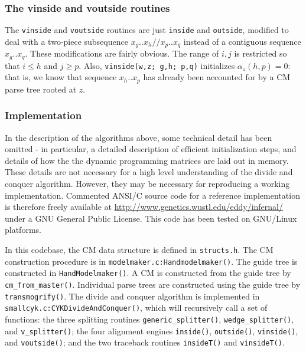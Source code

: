 \documentclass[11pt]{article}
\begin{document}
\subsubsection{The vinside and voutside routines}

The \texttt{vinside} and \texttt{voutside} routines are just
\texttt{inside} and \texttt{outside}, modified to deal with a
two-piece subsequence $x_g..x_h//x_p..x_q$ instead of a contiguous
sequence $x_g..x_q$. These modifications are fairly obvious. The
range of $i,j$ is restricted so that $i \leq h$ and $j \geq p$.  Also,
\texttt{vinside(w,z; g,h; p,q)} initializes $\alpha_z(h,p) = 0$: that
is, we know that sequence $x_h..x_p$ has already been accounted for by
a CM parse tree rooted at $z$.

\subsubsection{Implementation}

In the description of the algorithms above, some technical detail has
been omitted - in particular, a detailed description of efficient
initialization steps, and details of how the the dynamic programming
matrices are laid out in memory. These details are not necessary for a
high level understanding of the divide and conquer algorithm. However,
they may be necessary for reproducing a working
implementation. Commented ANSI/C source code for a reference
implementation is therefore freely available at
\url{http://www.genetics.wustl.edu/eddy/infernal/} under a GNU General
Public License. This code has been tested on GNU/Linux platforms.

In this codebase, the CM data structure is defined in
\texttt{structs.h}. The CM construction procedure is in
\texttt{modelmaker.c:Handmodelmaker()}. The guide tree is constructed
in \texttt{HandModelmaker()}. A CM is constructed from the guide tree
by \texttt{cm\_from\_master()}. Individual parse trees are constructed
using the guide tree by \texttt{transmogrify()}.  The divide and
conquer algorithm is implemented in
\texttt{smallcyk.c:CYKDivideAndConquer()}, which will recursively call
a set of functions: the three splitting routines
\texttt{generic\_splitter()}, \texttt{wedge\_splitter()}, and
\texttt{v\_splitter()}; the four alignment engines \texttt{inside()},
\texttt{outside()}, \texttt{vinside()}, and \texttt{voutside()}; and
the two traceback routines \texttt{insideT()} and \texttt{vinsideT()}.


\end{document}

